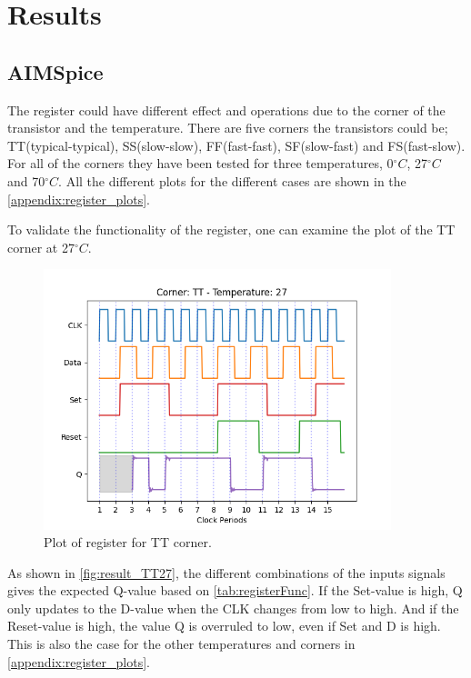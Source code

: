 \section{Results}
\label{sec:results}

\subsection{AIMSpice}

The register could have different effect and operations due to the corner of the transistor and the temperature. There are five corners the transistors could be; TT(typical-typical), SS(slow-slow), FF(fast-fast), SF(slow-fast) and FS(fast-slow).  For all of the corners they have been tested for three temperatures, 0$^\circ C$, 27$^\circ C$ and 70$^\circ C$. All the different plots for the different cases are shown in the \autoref{appendix:register_plots}. 

To validate the functionality of the register, one can examine the plot of the TT corner at 27$^\circ C$. 

\begin{figure}[H]
    \centering
    \includegraphics[width=0.9\textwidth]{Figures/Aimspice_Plots/TT_27.png}
    \caption{Plot of register for TT corner.}
    \label{fig:result_TT27}
\end{figure}

As shown in \autoref{fig:result_TT27}, the different combinations of the inputs signals gives the expected Q-value based on \autoref{tab:registerFunc}. If the Set-value is high, Q only updates to the D-value when the CLK changes from low to high. And if the Reset-value is high, the value Q is overruled to low, even if Set and D is high. This is also the case for the other temperatures and corners in \autoref{appendix:register_plots}.

